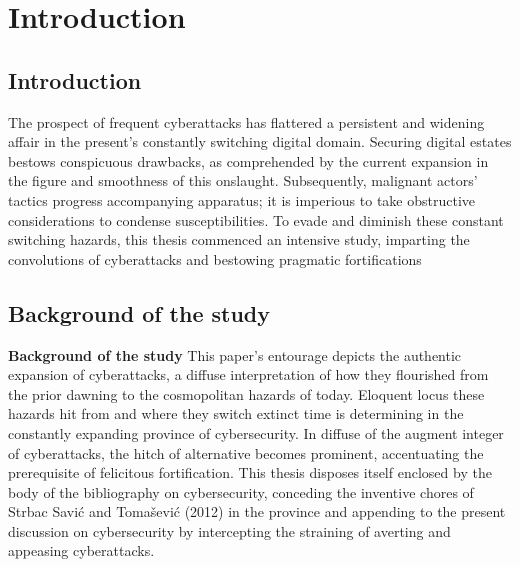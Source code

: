 \chapter{Introduction}
\label{ch:into} %


\section{Introduction}
\label{sec:into_back}

The prospect of frequent cyberattacks has flattered a persistent and widening affair in the present's constantly switching digital domain. Securing digital estates bestows conspicuous drawbacks, as comprehended by the current expansion in the figure and smoothness of this onslaught. Subsequently, malignant actors' tactics progress accompanying apparatus; it is imperious to take obstructive considerations to condense susceptibilities. To evade and diminish these constant switching hazards, this thesis commenced an intensive study, imparting the convolutions of cyberattacks and bestowing pragmatic fortifications


\section{Background of the study}
\label{sec:into_back}
\textbf{Background of the study}
This paper's entourage depicts the authentic expansion of cyberattacks, a diffuse interpretation of how they flourished from the prior dawning to the cosmopolitan hazards of today. Eloquent locus these hazards hit from and where they switch extinct time is determining in the constantly expanding province of cybersecurity. In diffuse of the augment integer of cyberattacks, the hitch of alternative becomes prominent, accentuating the prerequisite of felicitous fortification. This thesis disposes itself enclosed by the body of the bibliography on cybersecurity, conceding the inventive chores of Strbac Savić and Tomašević (2012) in the province and appending to the present discussion on cybersecurity by intercepting the straining of averting and appeasing cyberattacks.

